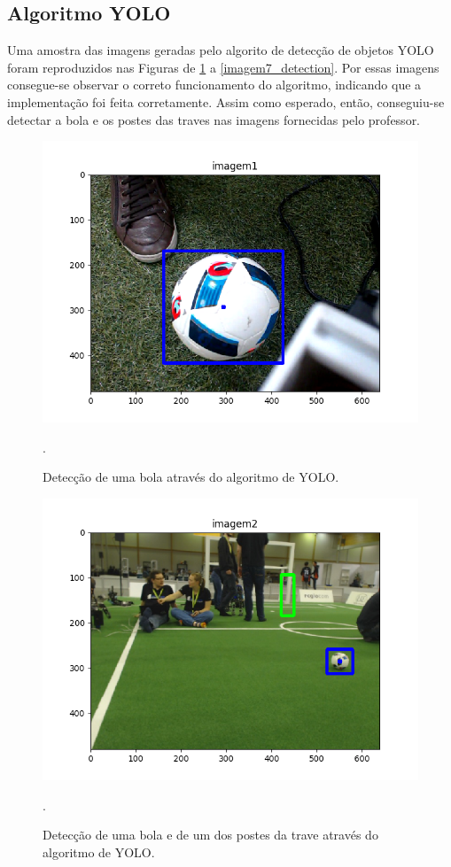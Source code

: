 \documentclass[conference]{IEEEtran}
\begin{document}
\subsection{Algoritmo YOLO}
Uma amostra das imagens geradas pelo algorito de detecção de objetos YOLO foram reproduzidos nas Figuras de \ref{imagem1_detection} a \ref{imagem7_detection}. Por essas imagens consegue-se observar o correto funcionamento do algoritmo, indicando que a implementação foi feita corretamente. Assim como esperado, então, conseguiu-se detectar a bola e os postes das traves nas imagens fornecidas pelo professor.

\begin{figure}[htbp]
\centering
\centerline{\includegraphics[scale=0.5]{imagens/imagem1_detection.png}}
\caption{Detecção de uma bola através do algoritmo de YOLO.}.
\label{imagem1_detection}
\end{figure}

\begin{figure}[htbp]
\centering
\centerline{\includegraphics[scale=0.5]{imagens/imagem2_detection.png}}
\caption{Detecção de uma bola e de um dos postes da trave através do algoritmo de YOLO.}.
\label{imagem2_detection}
\end{figure}
\end{document}
